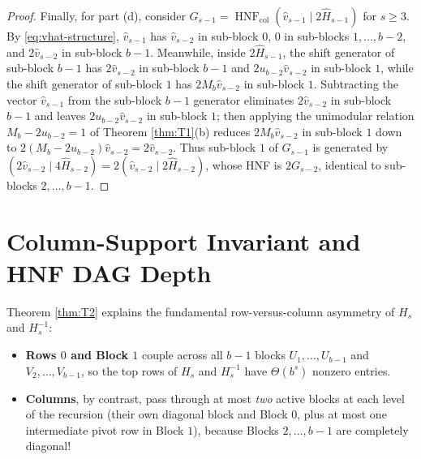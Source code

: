 \documentclass[11pt,a4paper]{article}
\theoremstyle{plain}
\theoremstyle{definition}
\newcommand{\HNF}{\operatorname{HNF}}
\newcommand{\col}{\operatorname{col}}
\begin{document}
\begin{proof}
Finally, for part (d), consider $G_{s-1} = \HNF_{\col}(\hat{v}_{s-1} \mid 2\hat{H}_{s-1})$ for $s \ge 3$. By \eqref{eq:vhat-structure}, $\hat{v}_{s-1}$ has $\hat{v}_{s-2}$ in sub-block $0$, $0$ in sub-blocks $1, \dots, b-2$, and $2\hat{v}_{s-2}$ in sub-block $b-1$. Meanwhile, inside $2\hat{H}_{s-1}$, the shift generator of sub-block $b-1$ has $2\hat{v}_{s-2}$ in sub-block $b-1$ and $2 u_{b-2} \hat{v}_{s-2}$ in sub-block $1$, while the shift generator of sub-block $1$ has $2 M_b \hat{v}_{s-2}$ in sub-block $1$. Subtracting the vector $\hat{v}_{s-1}$ from the sub-block $b-1$ generator eliminates $2\hat{v}_{s-2}$ in sub-block $b-1$ and leaves $2 u_{b-2} \hat{v}_{s-2}$ in sub-block $1$; then applying the unimodular relation $M_b - 2 u_{b-2} = 1$ of Theorem \ref{thm:T1}(b) reduces $2 M_b \hat{v}_{s-2}$ in sub-block $1$ down to $2(M_b - 2 u_{b-2})\hat{v}_{s-2} = 2\hat{v}_{s-2}$. Thus sub-block $1$ of $G_{s-1}$ is generated by $(2\hat{v}_{s-2} \mid 4\hat{H}_{s-2}) = 2(\hat{v}_{s-2} \mid 2\hat{H}_{s-2})$, whose HNF is $2 G_{s-2}$, identical to sub-blocks $2, \dots, b-1$.
\end{proof}

\section{Column-Support Invariant and HNF DAG Depth}

Theorem \ref{thm:T2} explains the fundamental row-versus-column asymmetry of $H_s$ and $H_s^{-1}$:
\begin{itemize}[nosep]
\item \textbf{Rows $0$ and Block $1$} couple across all $b-1$ blocks $U_1, \dots, U_{b-1}$ and $V_2, \dots, V_{b-1}$, so the top rows of $H_s$ and $H_s^{-1}$ have $\Theta(b^s)$ nonzero entries.
\item \textbf{Columns}, by contrast, pass through at most \emph{two} active blocks at each level of the recursion (their own diagonal block and Block $0$, plus at most one intermediate pivot row in Block $1$), because Blocks $2, \dots, b-1$ are completely diagonal!
\end{itemize}
\end{document}
